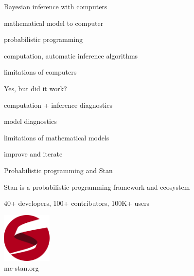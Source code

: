 \documentclass[english,t]{beamer}
\begin{document}
\begin{frame}{Bayesian inference with computers}

  \vspace{\baselineskip}
\hspace{1cm}  \begin{minipage}[t]{0.8\linewidth}
  mathematical model to computer
      \vspace{\baselineskip}

probabilistic programming
      \vspace{\baselineskip}

computation, automatic inference algorithms
      \vspace{\baselineskip}

limitations of computers
\end{minipage}

\end{frame}

\begin{frame}{Yes, but did it work?}

  \vspace{\baselineskip}
\hspace{1cm}  \begin{minipage}[t]{0.8\linewidth}
computation + inference diagnostics
      \vspace{\baselineskip}

model diagnostics
      \vspace{\baselineskip}

limitations of mathematical models
      \vspace{\baselineskip}

improve and iterate
\end{minipage}

\end{frame}

\begin{frame}{Probabilistic programming and Stan}

  Stan is a probabilistic programming framework and ecosystem

  40+ developers, 100+ contributors, 100K+ users

  \center
  \vspace{\baselineskip}
  \includegraphics[width=2.5cm]{stan_logo_wide.png}\\
  mc-stan.org
  
\end{frame}
\end{document}
